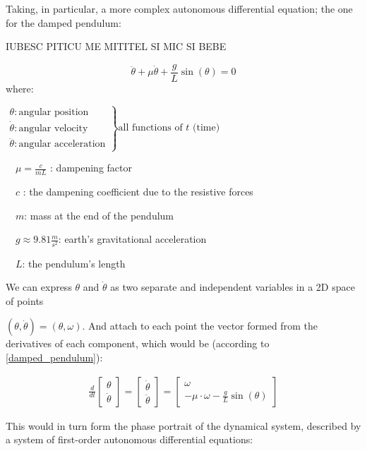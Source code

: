 Taking, in particular, a more complex autonomous differential equation; the one for the damped pendulum:

IUBESC PITICU ME MITITEL SI MIC SI BEBE

\begin{equation}\label{damped_pendulum}
  \ddot{\theta} +\mu\dot{\theta} + \frac{g}{L}\sin(\theta) = 0
\end{equation}
where:  \par
$
\left.
\begin{array}{l}
  \theta : \text{angular position}       \\
  \dot{\theta} : \text{angular velocity} \\
  \ddot{\theta} : \text{angular acceleration}
\end{array}
\right\}
\text{all functions of } t \text{ (time)}
$

\ \ $\mu = \frac{c}{mL}$ : dampening factor \par
\ \ $c$ : the dampening coefficient due to the resistive forces \par
\ \ $m$: mass at the end of the pendulum \par
\ \ $g \approx 9.81 \frac{m}{s^2}$: earth's gravitational acceleration \par
\ \ $L$: the pendulum's length \par

We can express $\theta$ and $\dot{\theta}$ as two separate and independent variables in a 2D space of points \par $(\theta,\dot{\theta}) = (\theta,\omega)$.
And attach to each point the vector formed from the derivatives of each component, which would be (according to \ref{damped_pendulum}):

\begin{align}
\frac{d}{dt}
\begin{bmatrix}
  \theta \\
  \dot{\theta}
\end{bmatrix} =
\begin{bmatrix}
  \dot{\theta} \\
  \ddot{\theta}
\end{bmatrix} =
\begin{bmatrix}
  \omega \\
  -\mu \cdot \omega - \frac{g}{L}\sin(\theta)
\end{bmatrix}
\end{align}

This would in turn form the phase portrait of the dynamical system, described by a system of first-order autonomous differential equations:

